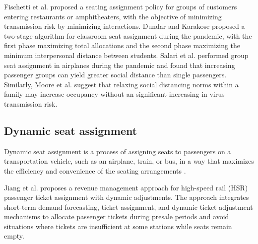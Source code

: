 

Fischetti et al. \cite{fischetti2021safe} proposed a seating assignment policy for groups of customers entering restaurants or amphitheaters, with the objective of minimizing transmission risk by minimizing interactions. Dundar and Karakose \cite{dundar2021seat} proposed a two-stage algorithm for classroom seat assignment during the pandemic, with the first phase maximizing total allocations and the second phase maximizing the minimum interpersonal distance between students. Salari et al. \cite{salari2022social} performed group seat assignment in airplanes during the pandemic and found that increasing passenger groups can yield greater social distance than single passengers. Similarly, Moore et al. \cite{moore2021seat} suggest that relaxing social distancing norms within a family may increase occupancy without an significant increasing in virus transmission risk.




\subsection{Dynamic seat assignment}
Dynamic seat assignment is a process of assigning seats to passengers on a transportation vehicle, such as an airplane, train, or bus, in a way that maximizes the efficiency and convenience of the seating arrangements \cite{hamdouch2011schedule, berge1993demand}. 

Jiang et al. \cite{jiang2015dynamic} proposes a revenue management approach for high-speed rail (HSR) passenger ticket assignment with dynamic adjustments. The approach integrates short-term demand forecasting, ticket assignment, and dynamic ticket adjustment mechanisms to allocate passenger tickets during presale periods and avoid situations where tickets are insufficient at some stations while seats remain empty.

